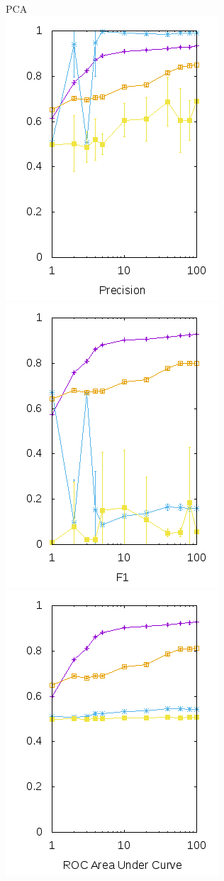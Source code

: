 \documentclass[10pt, a4paper]{article}
\begin{document}
\begin{figure}[H]
  \begin{minipage}{1\textwidth}
  \center PCA\\
	\includegraphics[scale=0.5]{../src/data/prpca.png}
	\includegraphics[scale=0.5]{../src/data/f1pca.png}
	\includegraphics[scale=0.5]{../src/data/ropca.png}

\end{minipage}
\end{figure}
\end{document}
